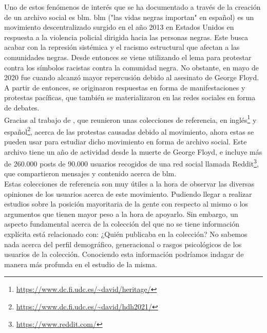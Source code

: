 Uno de estos fenómenos de interés que se ha documentado a través de la creación de un archivo social es \acrfull{blm}. \acrlong{blm} ("las vidas negras importan" en español) es un movimiento descentralizado surgido en el año 2013 en Estados Unidos en respuesta a la violencia policial dirigida hacia las personas negras. Este busca acabar con la represión sistémica y el racismo estructural que afectan a las comunidades negras. Desde entonces se viene utilizando el lema para protestar contra los símbolos racistas contra la comunidad negra. No obstante, en mayo de 2020 fue cuando alcanzó mayor repercusión debido al asesinato de George Floyd. A partir de entonces, se originaron respuestas en forma de manifestaciones y protestas pacíficas, que también se materializaron en las redes sociales en forma de debates.\\
Gracias al trabajo de \citet{heritage_BLM}, que reunieron unas colecciones de referencia, en inglés\footnote{\url{https://www.dc.fi.udc.es/~david/heritage/}} y español\footnote{\url{https://www.dc.fi.udc.es/~david/hdh2021/}}, acerca de las protestas causadas debido al movimiento, ahora estas se pueden usar para estudiar dicho movimiento en forma de archivo social. Este archivo tiene un año de actividad desde la muerte de George Floyd, e incluye más de 260.000 posts de 90.000 usuarios recogidos de una red social llamada Reddit\footnote{\url{https://www.reddit.com/}}, que compartieron mensajes y contenido acerca de \acrshort{blm}.\\
Estas colecciones de referencia son muy útiles a la hora de observar las diversas opiniones de los usuarios acerca de este movimiento. Pudiendo llegar a realizar estudios sobre la posición mayoritaria de la gente con respecto al mismo o los argumentos que tienen mayor peso a la hora de apoyarlo. Sin embargo, un aspecto fundamental acerca de la colección del que no se tiene información explícita está relacionado con: ¿Quién publicaba en la colección? No sabemos nada acerca del perfil demográfico, generacional o rasgos psicológicos de los usuarios de la colección. Conociendo esta información podríamos indagar de manera más profunda en el estudio de la misma.

